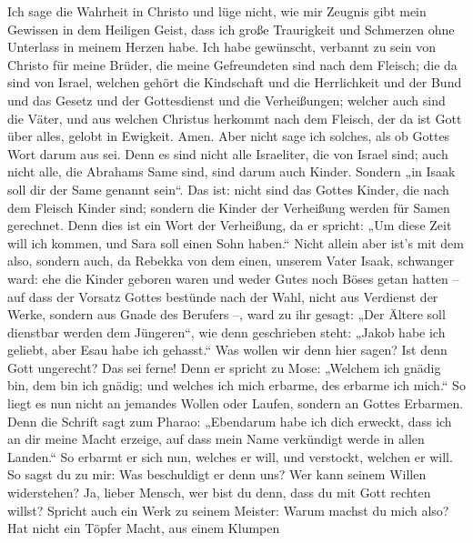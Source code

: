  Ich sage die Wahrheit in Christo und lüge nicht, wie mir
Zeugnis gibt mein Gewissen in dem Heiligen Geist,  dass
ich große Traurigkeit und Schmerzen ohne Unterlass in meinem Herzen
habe.  Ich habe gewünscht, verbannt zu sein von Christo
für meine Brüder, die meine Gefreundeten sind nach dem Fleisch;
 die da sind von Israel, welchen gehört die Kindschaft und
die Herrlichkeit und der Bund und das Gesetz und der Gottesdienst und
die Verheißungen;  welcher auch sind die Väter, und aus
welchen Christus herkommt nach dem Fleisch, der da ist Gott über alles,
gelobt in Ewigkeit. Amen.  Aber nicht sage ich solches,
als ob Gottes Wort darum aus sei. Denn es sind nicht alle Israeliter,
die von Israel sind;  auch nicht alle, die Abrahams Same
sind, sind darum auch Kinder. Sondern „in Isaak soll dir der Same
genannt sein``.  Das ist: nicht sind das Gottes Kinder,
die nach dem Fleisch Kinder sind; sondern die Kinder der Verheißung
werden für Samen gerechnet.  Denn dies ist ein Wort der
Verheißung, da er spricht: „Um diese Zeit will ich kommen, und Sara soll
einen Sohn haben.``  Nicht allein aber ist's mit dem
also, sondern auch, da Rebekka von dem einen, unserem Vater Isaak,
schwanger ward:  ehe die Kinder geboren waren und weder
Gutes noch Böses getan hatten -- auf dass der Vorsatz Gottes bestünde
nach der Wahl,  nicht aus Verdienst der Werke, sondern
aus Gnade des Berufers --, ward zu ihr gesagt: „Der Ältere soll
dienstbar werden dem Jüngeren``,  wie denn geschrieben
steht: „Jakob habe ich geliebt, aber Esau habe ich gehasst.``
 Was wollen wir denn hier sagen? Ist denn Gott ungerecht?
Das sei ferne!  Denn er spricht zu Mose: „Welchem ich
gnädig bin, dem bin ich gnädig; und welches ich mich erbarme, des
erbarme ich mich.``  So liegt es nun nicht an jemandes
Wollen oder Laufen, sondern an Gottes Erbarmen.  Denn die
Schrift sagt zum Pharao: „Ebendarum habe ich dich erweckt, dass ich an
dir meine Macht erzeige, auf dass mein Name verkündigt werde in allen
Landen.``  So erbarmt er sich nun, welches er will, und
verstockt, welchen er will.  So sagst du zu mir: Was
beschuldigt er denn uns? Wer kann seinem Willen widerstehen?
 Ja, lieber Mensch, wer bist du denn, dass du mit Gott
rechten willst? Spricht auch ein Werk zu seinem Meister: Warum machst du
mich also?  Hat nicht ein Töpfer Macht, aus einem Klumpen
